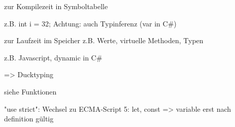 %
%
 zur Kompilezeit in Symboltabelle

z.B. int i = 32;  
Achtung: auch Typinferenz (var in C\#)

 zur Laufzeit im Speicher z.B. Werte, virtuelle Methoden, Typen

z.B. Javascript, dynamic in C\# 

=> Ducktyping

 siehe Funktionen

%
%


"use strict": Wechsel zu ECMA-Script 5: let, const => variable erst nach definition gültig